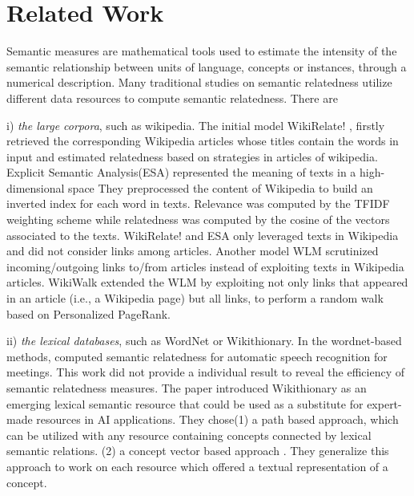 \section{Related Work}
\label{related-word}
Semantic measures are mathematical tools used to estimate the intensity of the 
semantic relationship between units of language, concepts or instances, through 
a numerical description. Many traditional studies on semantic relatedness utilize
different data resources to compute semantic relatedness. There are

i) \emph{the large corpora}, such as wikipedia. 
The initial model WikiRelate! \cite{aaai/StrubeP06}, firstly retrieved the corresponding Wikipedia
articles whose titles contain the words in input and estimated relatedness based on strategies in articles of wikipedia.
Explicit Semantic Analysis(ESA)\cite{ijcai/GabrilovichM07} represented the meaning of texts in a high-dimensional space
They preprocessed the content of Wikipedia to build an inverted index for each word in texts.
Relevance was computed by the TFIDF weighting scheme while relatedness was computed by
the cosine of the vectors associated to the texts. WikiRelate! and ESA only leveraged texts in
Wikipedia and did not consider links among articles. Another model WLM \cite{aaai/Milne08} scrutinized incoming/outgoing
links to/from articles instead of exploiting texts in Wikipedia articles.
WikiWalk \cite{textgraphs/YehRMAS09} extended the WLM by exploiting not only links that appeared in an article
(i.e., a Wikipedia page) but all links, to perform a random walk based on Personalized PageRank.

ii) \emph{the lexical databases}, such as WordNet or Wikithionary. 
In the wordnet-based methods\cite{acl/Pucher07}, computed semantic relatedness for automatic speech recognition for meetings.
This work did not provide a individual result to reveal the efficiency of semantic relatedness measures.
The paper \cite{aaai/ZeschMG08} introduced Wikithionary as an emerging lexical semantic resource
that could be used as a substitute for expert-made resources in AI applications.
They chose(1) a path based approach\cite{its/Rada89}, which can be utilized with any
resource containing concepts connected by lexical semantic relations. (2) a concept vector based approach
\cite{ijcai/GabrilovichM07}. They generalize this approach to work on each resource which offered a textual representation of a concept.

